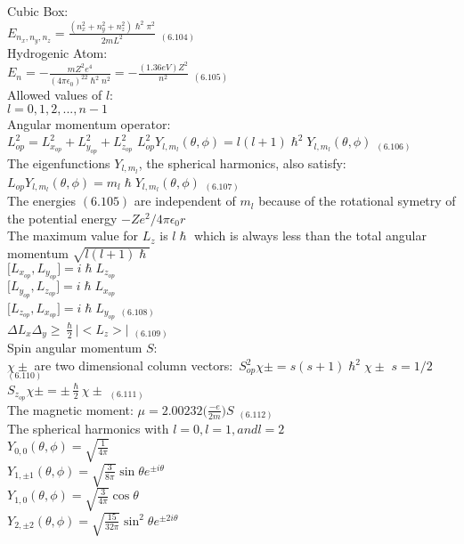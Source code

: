 \documentclass[0pt]{report}
\begin{document}
\begin{multicols*}{3}
\begin{flushleft}
Cubic Box:\\
$E_{n_x,n_y,n_z}=\frac{(n_x^2+n_y^2+n_z^2)\hslash^2\pi^2}{2mL^2}$ $_{(6.104)}$\\
Hydrogenic Atom:\\
$E_n=-\frac{mZ^2e^4}{(4\pi\epsilon_0)^22\hslash^2n^2}=-\frac{(1.36eV)Z^2}{n^2}$ $_{(6.105)}$\\
Allowed values of $l$:\\
$l=0,1,2,...,n-1$\\
Angular momentum operator:\\
$L^2_{op}=L^2_{x_{op}}+L^2_{y_{op}}+L^2_{z_{op}}$
$L^2_{op}Y_{l,m_l}(\theta,\phi)=l(l+1)\hslash^2Y_{l,m_l}(\theta,\phi)$ $_{(6.106)}$\\
The eigenfunctions $Y_{l,m_l}$, the spherical harmonics, also satisfy:\\
$L_{op}Y_{l,m_l}(\theta,\phi)=m_l\hslash Y_{l,m_l}(\theta,\phi)$ $_{(6.107)}$\\
The energies $(6.105)$ are independent of $m_l$ because of the rotational symetry of the potential energy $-Ze^2/4\pi\epsilon_0 r$\\
The maximum value for $L_z$ is $l\hslash$ which is always less than the total angular momentum $\sqrt{l(l+1)\hslash}$\\
$\big[L_{x_{op}},L_{y_{op}}\big]=i\hslash L_{z_{op}}$\\
$\big[L_{y_{op}},L_{z_{op}}\big]=i\hslash L_{x_{op}}$\\
$\big[L_{z_{op}},L_{x_{op}}\big]=i\hslash L_{y_{op}}$ $_{(6.108)}$\\
$\Delta L_x\Delta_y\geq\frac{\hslash}{2}|\big<L_z\big>|$ $_{(6.109)}$\\
Spin angular momentum $S$:\\
$\chi\pm$ are two dimensional column vectors:\
$S_{op}^2\chi\pm=s(s+1)\hslash^2\chi\pm$ $s=1/2$ $_{(6.110)}$\\
$S_{z_{op}}\chi\pm=\pm\frac{\hslash}{2}\chi\pm$ $_{(6.111)}$\\
The magnetic moment:
$\mu=2.00232\Big(\frac{-e}{2m}\Big)S$ $_{(6.112)}$\\
The spherical harmonics with $l=0,l=1, and l=2$\\
$Y_{0,0}(\theta,\phi)=\sqrt{\frac{1}{4\pi}}$\\
$Y_{1,\pm 1}(\theta,\phi)=\sqrt{\frac{3}{8\pi}}\sin\theta e^{\pm i\theta}$\\
$Y_{1,0}(\theta,\phi)=\sqrt{\frac{3}{4\pi}}\cos\theta$\\
$Y_{2,\pm 2}(\theta,\phi)=\sqrt{\frac{15}{32\pi}}\sin^2\theta e^{\pm 2i\theta}$\\

\end{flushleft}
\end{multicols*}
\end{document}
